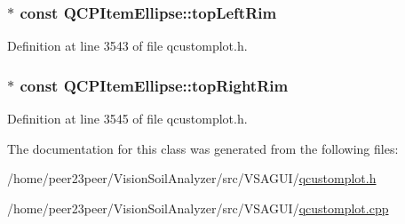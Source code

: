 \subsubsection[{top\+Left\+Rim}]{$\ast$ const Q\+C\+P\+Item\+Ellipse\+::top\+Left\+Rim}\label{class_q_c_p_item_ellipse_a33ebd2a751b63b9240edc9aa46c19eff}


Definition at line 3543 of file qcustomplot.\+h.

\hypertarget{class_q_c_p_item_ellipse_a744446970b38a4a3bbea46d722b7c54d}{}
\subsubsection[{top\+Right\+Rim}]{$\ast$ const Q\+C\+P\+Item\+Ellipse\+::top\+Right\+Rim}\label{class_q_c_p_item_ellipse_a744446970b38a4a3bbea46d722b7c54d}


Definition at line 3545 of file qcustomplot.\+h.



The documentation for this class was generated from the following files\+:\begin{DoxyCompactItemize}
\item 
/home/peer23peer/\+Vision\+Soil\+Analyzer/src/\+V\+S\+A\+G\+U\+I/\hyperlink{qcustomplot_8h}{qcustomplot.\+h}\item 
/home/peer23peer/\+Vision\+Soil\+Analyzer/src/\+V\+S\+A\+G\+U\+I/\hyperlink{qcustomplot_8cpp}{qcustomplot.\+cpp}\end{DoxyCompactItemize}

